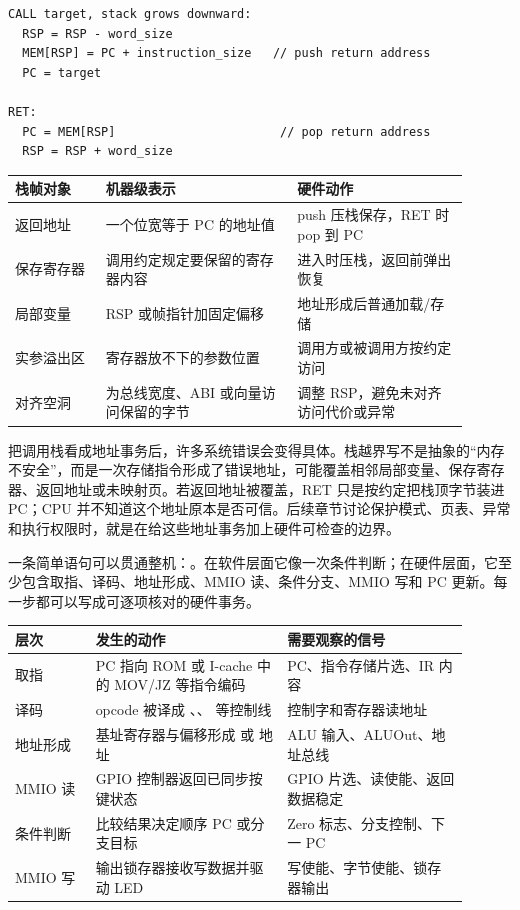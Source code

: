 \begin{lstlisting}
CALL target, stack grows downward:
  RSP = RSP - word_size
  MEM[RSP] = PC + instruction_size   // push return address
  PC = target

RET:
  PC = MEM[RSP]                       // pop return address
  RSP = RSP + word_size
\end{lstlisting}

\begin{longtable}{L{0.18\linewidth}L{0.38\linewidth}L{0.34\linewidth}}
\toprule
栈帧对象 & 机器级表示 & 硬件动作 \\
\midrule
返回地址 & 一个位宽等于 PC 的地址值 & push 压栈保存，RET 时 pop 到 PC \\
保存寄存器 & 调用约定规定要保留的寄存器内容 & 进入时压栈，返回前弹出恢复 \\
局部变量 & RSP 或帧指针加固定偏移 & 地址形成后普通加载/存储 \\
实参溢出区 & 寄存器放不下的参数位置 & 调用方或被调用方按约定访问 \\
对齐空洞 & 为总线宽度、ABI 或向量访问保留的字节 & 调整 RSP，避免未对齐访问代价或异常 \\
\bottomrule
\end{longtable}

把调用栈看成地址事务后，许多系统错误会变得具体。栈越界写不是抽象的“内存不安全”，而是一次存储指令形成了错误地址，可能覆盖相邻局部变量、保存寄存器、返回地址或未映射页。若返回地址被覆盖，RET 只是按约定把栈顶字节装进 PC；CPU 并不知道这个地址原本是否可信。后续章节讨论保护模式、页表、异常和执行权限时，就是在给这些地址事务加上硬件可检查的边界。

一条简单语句可以贯通整机：。在软件层面它像一次条件判断；在硬件层面，它至少包含取指、译码、地址形成、MMIO 读、条件分支、MMIO 写和 PC 更新。每一步都可以写成可逐项核对的硬件事务。

\begin{longtable}{L{0.16\linewidth}L{0.38\linewidth}L{0.36\linewidth}}
\toprule
层次 & 发生的动作 & 需要观察的信号 \\
\midrule
取指 & PC 指向 ROM 或 I-cache 中的 MOV/JZ 等指令编码 & PC、指令存储片选、IR 内容 \\
译码 & opcode 被译成 、、 等控制线 & 控制字和寄存器读地址 \\
地址形成 & 基址寄存器与偏移形成  或  地址 & ALU 输入、ALUOut、地址总线 \\
MMIO 读 & GPIO 控制器返回已同步按键状态 & GPIO 片选、读使能、返回数据稳定 \\
条件判断 & 比较结果决定顺序 PC 或分支目标 & Zero 标志、分支控制、下一 PC \\
MMIO 写 & 输出锁存器接收写数据并驱动 LED & 写使能、字节使能、锁存器输出 \\
\bottomrule
\end{longtable}

